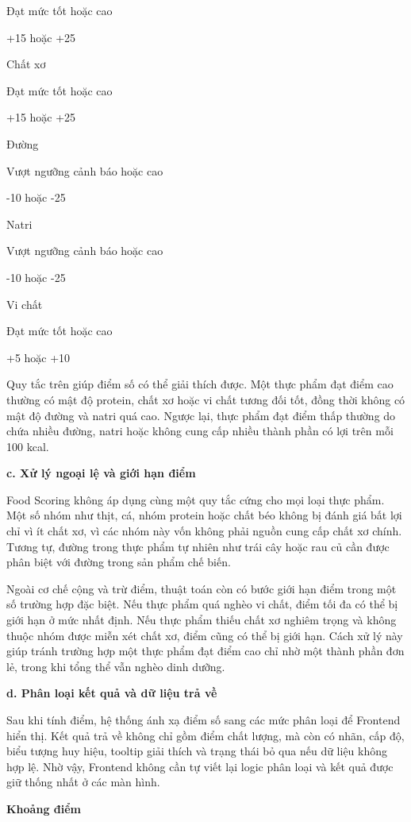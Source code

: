 Đạt mức tốt hoặc cao

+15 hoặc +25

Chất xơ

Đạt mức tốt hoặc cao

+15 hoặc +25

Đường

Vượt ngưỡng cảnh báo hoặc cao

-10 hoặc -25

Natri

Vượt ngưỡng cảnh báo hoặc cao

-10 hoặc -25

Vi chất

Đạt mức tốt hoặc cao

+5 hoặc +10

Quy tắc trên giúp điểm số có thể giải thích được. Một thực phẩm đạt điểm cao thường có mật độ protein, chất xơ hoặc vi chất tương đối tốt, đồng thời không có mật độ đường và natri quá cao. Ngược lại, thực phẩm đạt điểm thấp thường do chứa nhiều đường, natri hoặc không cung cấp nhiều thành phần có lợi trên mỗi 100 kcal.

\textbf{c. Xử lý ngoại lệ và giới hạn điểm}

Food Scoring không áp dụng cùng một quy tắc cứng cho mọi loại thực phẩm. Một số nhóm như thịt, cá, nhóm protein hoặc chất béo không bị đánh giá bất lợi chỉ vì ít chất xơ, vì các nhóm này vốn không phải nguồn cung cấp chất xơ chính. Tương tự, đường trong thực phẩm tự nhiên như trái cây hoặc rau củ cần được phân biệt với đường trong sản phẩm chế biến.

Ngoài cơ chế cộng và trừ điểm, thuật toán còn có bước giới hạn điểm trong một số trường hợp đặc biệt. Nếu thực phẩm quá nghèo vi chất, điểm tối đa có thể bị giới hạn ở mức nhất định. Nếu thực phẩm thiếu chất xơ nghiêm trọng và không thuộc nhóm được miễn xét chất xơ, điểm cũng có thể bị giới hạn. Cách xử lý này giúp tránh trường hợp một thực phẩm đạt điểm cao chỉ nhờ một thành phần đơn lẻ, trong khi tổng thể vẫn nghèo dinh dưỡng.

\textbf{d. Phân loại kết quả và dữ liệu trả về}

Sau khi tính điểm, hệ thống ánh xạ điểm số sang các mức phân loại để Frontend hiển thị. Kết quả trả về không chỉ gồm điểm chất lượng, mà còn có nhãn, cấp độ, biểu tượng huy hiệu, tooltip giải thích và trạng thái bỏ qua nếu dữ liệu không hợp lệ. Nhờ vậy, Frontend không cần tự viết lại logic phân loại và kết quả được giữ thống nhất ở các màn hình.

\textbf{Khoảng điểm}

